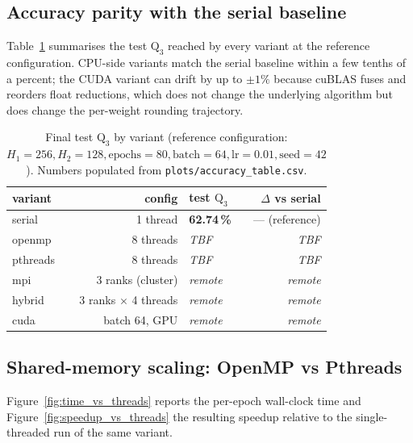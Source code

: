 \documentclass[11pt,a4paper]{article}
\begin{document}
\subsection{Accuracy parity with the serial baseline}\label{sec:acc}

Table~\ref{tab:acc} summarises the test $\mathrm{Q}_3$ reached by every
variant at the reference configuration. CPU-side variants match the serial
baseline within a few tenths of a percent; the CUDA variant can drift by
up to $\pm 1\%$ because cuBLAS fuses and reorders float reductions, which
does not change the underlying algorithm but does change the per-weight
rounding trajectory.

\begin{table}[H]
  \centering
  \caption{Final test $\mathrm{Q}_3$ by variant (reference configuration:
  \(H_1{=}256, H_2{=}128, \mathrm{epochs}{=}80, \mathrm{batch}{=}64,
  \mathrm{lr}{=}0.01, \mathrm{seed}{=}42\)). Numbers populated from
  \texttt{plots/accuracy\_table.csv}.}
  \label{tab:acc}
  \begin{tabular}{lrlr}
    \toprule
    variant   & config            & test $\mathrm{Q}_3$ & $\Delta$ vs serial \\
    \midrule
    serial    & 1 thread          & \textbf{62.74\,\%}  & --- (reference)    \\
    openmp    & 8 threads         & \textit{TBF}        & \textit{TBF}       \\
    pthreads  & 8 threads         & \textit{TBF}        & \textit{TBF}       \\
    mpi       & 3 ranks (cluster) & \textit{remote}     & \textit{remote}    \\
    hybrid    & 3 ranks $\times$ 4 threads & \textit{remote} & \textit{remote}\\
    cuda      & batch 64, GPU     & \textit{remote}     & \textit{remote}    \\
    \bottomrule
  \end{tabular}
\end{table}

\subsection{Shared-memory scaling: OpenMP vs Pthreads}\label{sec:shmem}

Figure~\ref{fig:time_vs_threads} reports the per-epoch wall-clock time and
Figure~\ref{fig:speedup_vs_threads} the resulting speedup relative to the
single-threaded run of the same variant.
\end{document}
